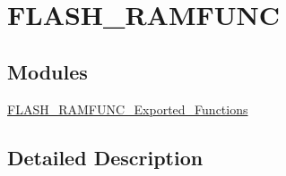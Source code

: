 \hypertarget{group___f_l_a_s_h___r_a_m_f_u_n_c}{\section{F\-L\-A\-S\-H\-\_\-\-R\-A\-M\-F\-U\-N\-C}
\label{group___f_l_a_s_h___r_a_m_f_u_n_c}
}
\subsection*{Modules}
\begin{DoxyCompactItemize}
\item 
\hyperlink{group___f_l_a_s_h___r_a_m_f_u_n_c___exported___functions}{F\-L\-A\-S\-H\-\_\-\-R\-A\-M\-F\-U\-N\-C\-\_\-\-Exported\-\_\-\-Functions}
\end{DoxyCompactItemize}


\subsection{Detailed Description}
